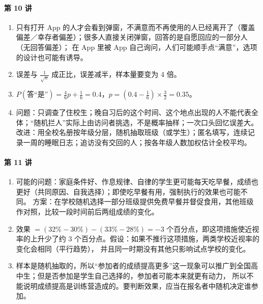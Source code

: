 \paragraph{第 10 讲}
\begin{enumerate}[label=10.\arabic*, leftmargin=2.6em]
  \item 只有打开 App 的人才会看到弹窗，不满意而不再使用的人已经离开了（覆盖偏差／幸存者偏差）；很多人直接关闭弹窗，回答的是自愿回应的一部分人（无回答偏差）；
        在 App 里被 App 自己询问，人们可能顺手点“满意”，选项的设计也可能有诱导。
  \item 误差与 $\frac1{\sqrt n}$ 成正比，误差减半，样本量要变为 4 倍。
  \item $P(\text{答“是”})=\frac46p+\frac16=0.4$，$p=(0.4-\frac16)\times\frac32=0.35$。
  \item 问题：只调查了住校生；晚自习后的这个时间、这个地点出现的人不能代表全体；“随机拦人”实际上由访问者挑选，不是概率抽样；一次口头回忆误差大。
        改进：用全校名册按年级分层，随机抽取班级（或学生）；匿名填写，连续记录一周的睡眠日志；追访没有交回的人；按各年级人数加权估计全校平均。
\end{enumerate}

\paragraph{第 11 讲}
\begin{enumerate}[label=11.\arabic*, leftmargin=2.6em]
  \item 可能的问题：家庭条件好、作息规律、自律的学生更可能每天吃早餐，成绩也更好（共同原因、自我选择）；即使吃早餐有用，强制执行的效果也可能不同。
        方案：在学校随机选择一部分班级提供免费早餐并督促食用，其他班级作对照，比较一段时间前后两组成绩的变化。
  \item 效果 $=(32\%-30\%)-(33\%-28\%)=-3$ 个百分点，即这项措施使近视率的上升少了约 3 个百分点。假设：如果不推行这项措施，两类学校近视率的变化会相同（平行趋势），
        并且同一时期没有其他只影响试点学校的变化。
  \item 样本是随机抽取的，所以“参加者的成绩提高更多”这一现象可以推广到全国高中生；但是否参加是学生自己选择的，参加者可能本来就更有动力，
        所以不能说明成绩提高是训练营造成的。要判断效果，应当在报名者中随机决定谁参加。
\end{enumerate}
